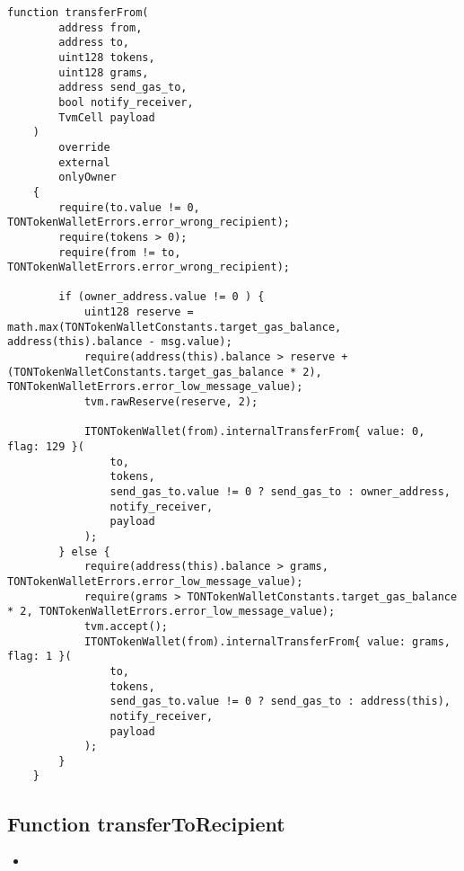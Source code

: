 \begin{lstlisting}[firstnumber=317]
    function transferFrom(
        address from,
        address to,
        uint128 tokens,
        uint128 grams,
        address send_gas_to,
        bool notify_receiver,
        TvmCell payload
    )
        override
        external
        onlyOwner
    {
        require(to.value != 0, TONTokenWalletErrors.error_wrong_recipient);
        require(tokens > 0);
        require(from != to, TONTokenWalletErrors.error_wrong_recipient);

        if (owner_address.value != 0 ) {
            uint128 reserve = math.max(TONTokenWalletConstants.target_gas_balance, address(this).balance - msg.value);
            require(address(this).balance > reserve + (TONTokenWalletConstants.target_gas_balance * 2), TONTokenWalletErrors.error_low_message_value);
            tvm.rawReserve(reserve, 2);

            ITONTokenWallet(from).internalTransferFrom{ value: 0, flag: 129 }(
                to,
                tokens,
                send_gas_to.value != 0 ? send_gas_to : owner_address,
                notify_receiver,
                payload
            );
        } else {
            require(address(this).balance > grams, TONTokenWalletErrors.error_low_message_value);
            require(grams > TONTokenWalletConstants.target_gas_balance * 2, TONTokenWalletErrors.error_low_message_value);
            tvm.accept();
            ITONTokenWallet(from).internalTransferFrom{ value: grams, flag: 1 }(
                to,
                tokens,
                send_gas_to.value != 0 ? send_gas_to : address(this),
                notify_receiver,
                payload
            );
        }
    }
\end{lstlisting}

\subsection{Function transferToRecipient}

\begin{itemize}
\item {}
\end{itemize}

